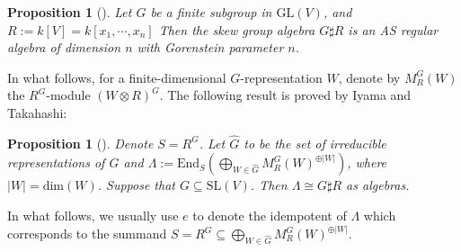 \documentclass[11pt,reqno]{amsart}
\newtheorem{proposition}[theorem]{Proposition}
\theoremstyle{definition}
\begin{document}
\begin{proposition}[\cite{MR}] \label{ASstru}
Let $G$ be a finite subgroup in $\mathrm{GL}(V)$,
and $R:=k[V]=k[x_1,\cdots, x_n]$
Then the skew group algebra $G \sharp R$ is an AS regular algebra of
dimension $n$ with Gorenstein parameter $n$.  
\end{proposition}

In what follows, for a finite-dimensional $G$-representation $W$, 
denote by $M^{G}_{R}(W)$ the $R^{G}$-module 
$(W \otimes R)^{G}$. 
The following result is proved by Iyama and Takahashi:

\begin{proposition}[{\cite[Theorem 4.2]{IT}}]
\label{prop:Lambda}
Denote $S = R^G$. 
Let $\hat{G}$ to be the set of irreducible representations of $G$ and 
$\Lambda:= 
\mathrm{End}_{S}(\bigoplus\limits_{W \in \hat{G}} M^{G}_{R}(W)^{\oplus |W|})$, 
where $|W| = \mathrm{dim}(W)$. Suppose that $G \subseteq \mathrm{SL}(V)$. 
Then $\Lambda\cong G\sharp R$ as algebras. 
\end{proposition}

In what follows, we usually use $e$ to denote the idempotent of $\Lambda$ 
which corresponds to the summand
$S = R^G \subseteq \bigoplus\limits_{W \in \hat{G}} M^{G}_{R}(W)^{\oplus |W|}$.
\end{document}
